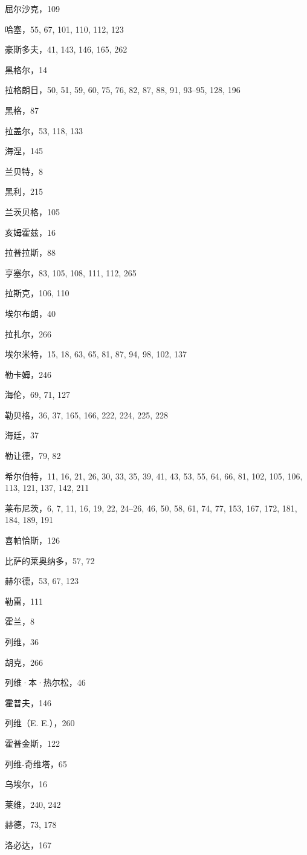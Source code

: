 屈尔沙克，109

哈塞，55, 67, 101, 110, 112, 123

豪斯多夫，41, 143, 146, 165, 262

黑格尔，14

拉格朗日，50, 51, 59, 60, 75, 76, 82, 87, 88, 91, 93--95, 128, 196

黑格，87

拉盖尔，53, 118, 133

海涅，145

兰贝特，8

黑利，215

兰茨贝格，105

亥姆霍兹，16

拉普拉斯，88

亨塞尔，83, 105, 108, 111, 112, 265

拉斯克，106, 110

埃尔布朗，40

拉扎尔，266

埃尔米特，15, 18, 63, 65, 81, 87, 94, 98, 102, 137

勒卡姆，246

海伦，69, 71, 127

勒贝格，36, 37, 165, 166, 222, 224, 225, 228

海廷，37

勒让德，79, 82

希尔伯特，11, 16, 21, 26, 30, 33, 35, 39, 41, 43, 53, 55, 64, 66, 81, 102, 105, 106, 113, 121, 137, 142, 211

莱布尼茨，6, 7, 11, 16, 19, 22, 24--26, 46, 50, 58, 61, 74, 77, 153, 167, 172, 181, 184, 189, 191

喜帕恰斯，126

比萨的莱奥纳多，57, 72

赫尔德，53, 67, 123

勒雷，111

霍兰，8

列维，36

胡克，266

列维·本·热尔松，46

霍普夫，146

列维（E. E.），260

霍普金斯，122

列维-奇维塔，65

乌埃尔，16

莱维，240, 242

赫德，73, 178

洛必达，167

